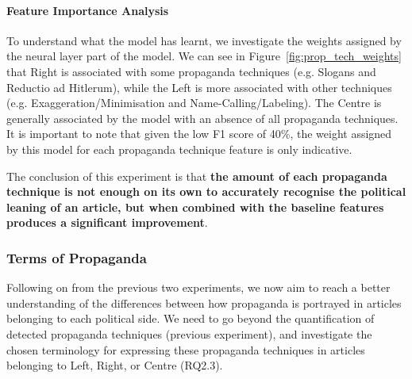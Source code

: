 \paragraph{Feature Importance Analysis}

To understand what the model has learnt, we investigate the weights assigned by the neural layer part of the model. We can see in Figure~\ref{fig:prop_tech_weights} that Right is associated with some propaganda techniques (e.g. Slogans and Reductio ad Hitlerum), while the Left is more associated with other techniques (e.g. Exaggeration/Minimisation and Name-Calling/Labeling).
The Centre is generally associated by the model with an absence of all  propaganda techniques. It is important to note that given the low F1 score of 40\%, the weight assigned by this model for each propaganda technique feature is only indicative. %




The conclusion of this experiment is that \textbf{the amount of each propaganda technique is not enough on its own to accurately recognise the political leaning of an article, but when combined with the baseline features produces a significant improvement}.


\subsubsection{Terms of Propaganda}

Following on from the previous two experiments, we now aim to reach a better understanding of the differences between how propaganda is portrayed in articles belonging to each political side.
We need to go beyond the quantification of detected propaganda techniques (previous experiment), and investigate the chosen terminology for expressing these propaganda techniques in articles belonging to Left, Right, or Centre (RQ2.3). %


